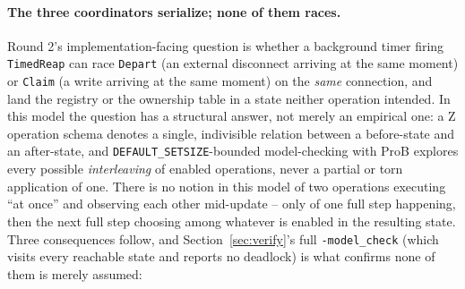 \documentclass[a4paper,10pt,fleqn]{article}
\begin{document}
\paragraph{The three coordinators serialize; none of them races.}
\label{sec:serialize}
Round 2's implementation-facing question is whether a background timer
firing \texttt{TimedReap} can race \texttt{Depart} (an external disconnect
arriving at the same moment) or \texttt{Claim} (a write arriving at the
same moment) on the \emph{same} connection, and land the registry or the
ownership table in a state neither operation intended. In this model the
question has a structural answer, not merely an empirical one: a Z
operation schema denotes a single, indivisible relation between a
before-state and an after-state, and \texttt{DEFAULT\_SETSIZE}-bounded
model-checking with ProB explores every possible \emph{interleaving} of
enabled operations, never a partial or torn application of one. There is
no notion in this model of two operations executing ``at once'' and
observing each other mid-update -- only of one full step happening, then
the next full step choosing among whatever is enabled in the resulting
state. Three consequences follow, and Section~\ref{sec:verify}'s full
\texttt{-model\_check} (which visits every reachable state and reports no
deadlock) is what confirms none of them is merely assumed:
\end{document}
